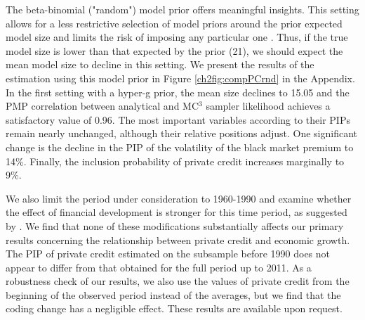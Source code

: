 \begin{refsection}
The beta-binomial ("random") model prior offers meaningful insights. This setting allows for a less restrictive selection of model priors around the prior expected model size and limits the risk of imposing any particular one \parencite{LeySteel2009}. Thus, if the true model size is lower than that expected by the prior (21), we should expect the mean model size to decline in this setting. 
%
We present the results of the estimation using this model prior in Figure \ref{ch2fig:compPCrnd} in the Appendix. In the first setting with a hyper-g prior, the mean size declines to 15.05 and the PMP correlation between analytical and MC$^{3}$ sampler likelihood achieves a satisfactory value of 0.96. The most important variables according to their \acp{PIP} remain nearly unchanged, although their relative positions adjust. One significant change is the decline in the PIP of the volatility of the black market premium to 14\%. Finally, the inclusion probability of private credit increases marginally to 9\%. 

We also limit the period under consideration to 1960-1990 and examine whether the effect of financial development is stronger for this time period, as suggested by \textcite{RousseauWachtel2011}. We find that none of these modifications substantially affects our primary results concerning the relationship between private credit and economic growth.  The PIP of private credit estimated on the subsample before 1990 does not appear to differ from that obtained for the full period up to 2011. As a robustness check of our results, we also use the values of private credit from the beginning of the observed period instead of the averages, but we find that the coding change has a negligible effect. These results are available upon request.


\end{refsection}
